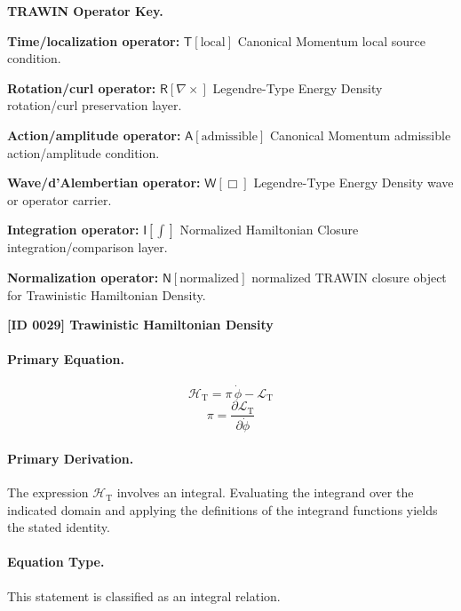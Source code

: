 \par\vspace{0.45\baselineskip}
\noindent\begin{minipage}[t]{\linewidth}
\begingroup
\small
\raggedright
\textbf{TRAWIN Operator Key.}\par
\noindent\textbf{Time/localization operator:} $\mathsf{T}\!\left[\mathrm{local}\right]$ Canonical Momentum local source condition.\par
\noindent\textbf{Rotation/curl operator:} $\mathsf{R}\!\left[\nabla\times\right]$ Legendre-Type Energy Density rotation/curl preservation layer.\par
\noindent\textbf{Action/amplitude operator:} $\mathsf{A}\!\left[\mathrm{admissible}\right]$ Canonical Momentum admissible action/amplitude condition.\par
\noindent\textbf{Wave/d'Alembertian operator:} $\mathsf{W}\!\left[\Box\right]$ Legendre-Type Energy Density wave or operator carrier.\par
\noindent\textbf{Integration operator:} $\mathsf{I}\!\left[\int\right]$ Normalized Hamiltonian Closure integration/comparison layer.\par
\noindent\textbf{Normalization operator:} $\mathsf{N}\!\left[\mathrm{normalized}\right]$ normalized TRAWIN closure object for Trawinistic Hamiltonian Density.\par
\endgroup
\end{minipage}

\clearpage
\noindent\textbf{[ID 0029] Trawinistic Hamiltonian Density}\par
\vspace{0.35em}
\paragraph{Primary Equation.}
\[
\mathcal{H}_{\mathrm{T}}
=
\pi\,\dot{\phi}
-\mathcal{L}_{\mathrm{T}}
\]
\[
\pi
=
\frac{\partial \mathcal{L}_{\mathrm{T}}}{\partial \dot{\phi}}
\]

\paragraph{Primary Derivation.}
The expression \( \mathcal{H}_{\mathrm{T}} \) involves an integral. Evaluating the integrand over the indicated domain and applying the definitions of the integrand functions yields the stated identity.
\paragraph{Equation Type.}
This statement is classified as an integral relation.

